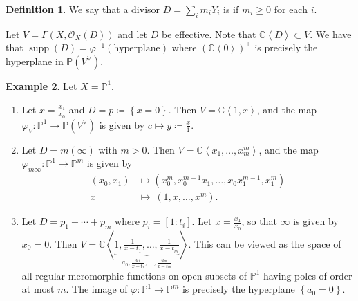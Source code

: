 \documentclass[10pt,letterpaper,cm]{nupset}
\theoremstyle{definition}
\newtheorem{defn}{Definition}[subsection]
\newtheorem{exmp}[defn]{Example}
\theoremstyle{theorem}
\theoremstyle{remark}
\newcommand{\C}{\mathbb C}
\renewcommand{\O}{\mathcal O}
\renewcommand{\P}{\mathbb P}
\newcommand{\1}{\mathbb{1}}
\newcommand{\0}{\vec 0}
\DeclareMathOperator{\supp}{supp}
\newcommand{\be}{\begin{enumerate}}
\newcommand{\ee}{\end{enumerate}}
\begin{document}
\begin{defn}
We say that a divisor $D = \sum_im_iY_i$ is  if $m_i\geq 0$ for each $i$.
\end{defn}

Let $V = \Gamma\left(X, \O_X(D)\right)$ and let $D$ be effective. Note that $\C\left\langle D \right\rangle \subset V$. We have that $\supp(D) = \varphi^{-1}\left(\text{hyperplane}\right)$ where $\left(\C \left\langle 0\right\rangle \right)^{\perp}$ is precisely the hyperplane in $\P\left(V^{\vee}\right)$.

\begin{exmp} Let $X = \P^1$.
\be
\item Let $x= \frac{x_1}{x_0}$ and $D =p \coloneqq \left\{x=0\right\}$. Then $V = \C\left\langle 1, x \right\rangle$, and the map $\varphi_V : \P^1 \to \P\left(V^{\vee}\right)$ is given by $c\mapsto y\coloneqq \frac{x}{1}$.
\item Let $D = m\left(\infty\right)$ with $m>0$. Then $V= \C\left\langle x_1, \ldots, x_m^m\right\rangle$, and the map $\varphi_{m{\infty}} : \P^1 \to \P^m$ is given by
\begin{align*}
\left(x_0, x_1\right) & \mapsto \left(x_0^m, x_0^{m-1}x_1, \ldots, x_0x_1^{m-1}, x_1^m\right)
\\ x \ & \mapsto \  \left(1, x, \ldots, x^m\right).
\end{align*}
\item Let $D = p_1 + \cdots + p_m$ where $p_i = \left[1:t_i\right]$. Let $x = \frac{x_1}{x_0}$, so that $\infty$ is given by $x_0 =0$. Then $V = \C\left\langle \underbrace{1, \frac{1}{x-t_1}, \ldots, \frac{1}{x-t_m}}_{a_0, \frac{a_1}{x-t_1}, \ldots, \frac{a_m}{x-t_m}}\right\rangle$. This can be viewed as the space of all regular meromorphic functions on open subsets of $\P^1$ having poles of order at most $m$. The image of $\varphi : \P^1 \to \P^m$ is precisely the hyperplane $\left\{a_0 =0\right\}$.
\ee
\end{exmp}
\end{document}
